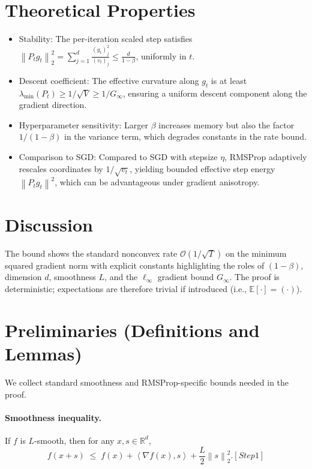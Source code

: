 \documentclass[11pt]{article}
\newcommand{\E}{\mathbb{E}}
\newcommand{\RR}{\mathbb{R}}
\newcommand{\norm}[1]{\left\lVert #1 \right\rVert}
\newcommand{\ip}[2]{\left\langle #1, #2 \right\rangle}
\begin{document}
\section*{Theoretical Properties}
\begin{itemize}
\item Stability: The per-iteration scaled step satisfies $\norm{P_t g_t}_2^2 = \sum_{j=1}^d \frac{(g_t)_j^2}{(v_t)_j} \le \frac{d}{1-\beta}$, uniformly in $t$.
\item Descent coefficient: The effective curvature along $g_t$ is at least $\lambda_{\min}(P_t)\ge 1/\sqrt{V}\ge 1/G_\infty$, ensuring a uniform descent component along the gradient direction.
\item Hyperparameter sensitivity: Larger $\beta$ increases memory but also the factor $1/(1-\beta)$ in the variance term, which degrades constants in the rate bound.
\item Comparison to SGD: Compared to SGD with stepsize $\eta$, RMSProp adaptively rescales coordinates by $1/\sqrt{v_t}$, yielding bounded effective step energy $\norm{P_t g_t}^2$, which can be advantageous under gradient anisotropy.
\end{itemize}

\section*{Discussion}
The bound shows the standard nonconvex rate $\mathcal{O}(1/\sqrt{T})$ on the minimum squared gradient norm with explicit constants highlighting the roles of $(1-\beta)$, dimension $d$, smoothness $L$, and the $\ell_\infty$ gradient bound $G_\infty$. The proof is deterministic; expectations are therefore trivial if introduced (i.e., $\E[\cdot]=(\cdot)$).

\section*{Preliminaries (Definitions and Lemmas)}
We collect standard smoothness and RMSProp-specific bounds needed in the proof.

\paragraph{Smoothness inequality.}
If $f$ is $L$-smooth, then for any $x,s\in\RR^d$,
\begin{equation}
f(x+s)\;\le\; f(x) + \ip{\nabla f(x)}{s} + \frac{L}{2}\norm{s}_2^2.
\tag{P1}[Step 1]
\end{equation}
\end{document}
